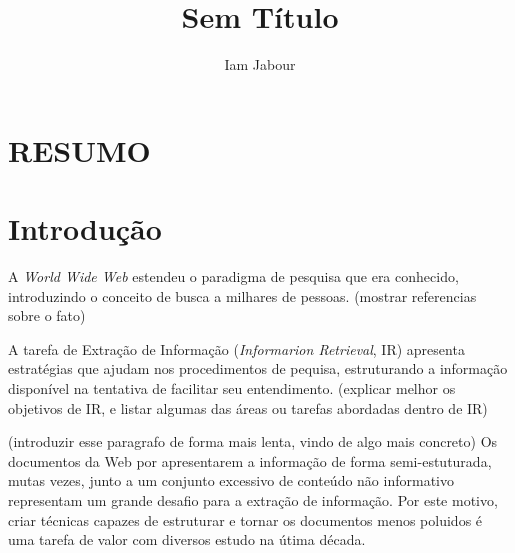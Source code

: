 \documentclass{acm_proc_article-sp}
\numberwithin{equation}{section}
\begin{document}
\title{Sem Título}

\author{
\alignauthor
Iam Jabour  
\and \alignauthor {}
}


\maketitle

\begin{abstract}


\end{abstract}

\section*{RESUMO}\normalsize %







\section{Introdução}

A {\it World Wide Web} estendeu o paradigma de pesquisa que era conhecido, 
	introduzindo o conceito de busca a milhares de pessoas. (mostrar
  referencias sobre o fato)


A tarefa de Extração de Informação ({\it Informarion Retrieval}, IR) apresenta 
	estratégias que ajudam nos procedimentos de pequisa, estruturando a 
	informação disponível na tentativa de facilitar seu entendimento.
  (explicar melhor os objetivos de IR, e listar algumas das áreas ou
  tarefas abordadas dentro de IR)

(introduzir esse paragrafo de forma mais lenta, vindo de algo mais
concreto)
Os documentos da Web por apresentarem a informação de forma semi-estuturada,
	mutas vezes, junto a um conjunto excessivo de conteúdo não informativo
	representam um grande desafio para a extração de informação. 
Por este motivo,
	criar técnicas capazes de estruturar e tornar os documentos menos poluidos
	é uma tarefa de valor com diversos estudo na útima década.
\end{document}
